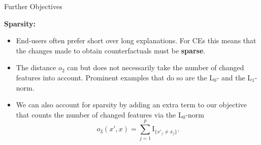 \documentclass[aspectratio=169]{../latex_main/tntbeamer}  %
\begin{document}
\begin{frame}[c]{Further Objectives }
	
	\textbf{Sparsity:}
	\begin{itemize}
		\item End-users often prefer short over long explanations. For CEs this means that the changes made to obtain counterfactuals must be \textbf{sparse}. 
		\item The distance $o_2$ can but does not necessarily take the number of changed features into account. Prominent examples that do so are the L$_0$- and the L$_1$-norm.
        \item We can also account for sparsity by adding an extra term to our objective that counts the number of changed features via the L$_0$-norm $$o_3(x', x) = \sum_{j = 1}^p \mathrm{I}_{\{ x'_j \neq x_j \}}.$$ 
	\end{itemize}
	
\end{frame}
\end{document}
